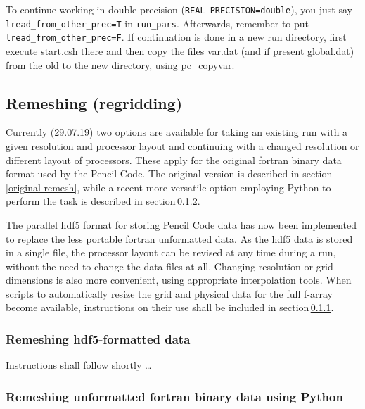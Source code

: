 \documentclass[\mydriver,12pt,twoside,notitlepage,a4paper]{article}
\newcommand{\code}[1]{\texttt{#1}}
\begin{document}
To continue working in double precision
(\code{REAL_PRECISION=double}), you just say
\code{lread_from_other_prec=T} in \code{run_pars}.
Afterwards, remember to put \code{lread_from_other_prec=F}.
If continuation is done in a new run directory, first execute start.csh there 
and then copy the files var.dat (and if present global.dat) from the old to the new directory,
using pc_copyvar.

\subsection{Remeshing (regridding)}
\label{S-remesh}
Currently (29.07.19) two options are available for taking an existing run with
a given resolution and processor layout and continuing with a changed
resolution or different layout of processors.
These apply for the original fortran binary data format used by the Pencil Code.
The original version is described in section\,\ref{original-remesh}, while
a recent more versatile option employing Python to perform the task is described
in section\,\ref{python-remesh}.

The parallel hdf5 format for storing Pencil Code data has now been implemented
to replace the less portable fortran unformatted data.
As the hdf5 data is stored in a single file, the processor layout can be
revised at any time during a run, without the need to change the data files at
all.
Changing resolution or grid dimensions is also more convenient, using
appropriate interpolation tools.
When scripts to automatically resize the grid and physical data for the full
f-array become available, instructions on their use 
shall be included in section\,\ref{h5-remesh}.

\subsubsection{Remeshing hdf5-formatted data}
\label{h5-remesh}
Instructions shall follow shortly \ldots

\subsubsection{Remeshing unformatted fortran binary data using Python}
\label{python-remesh}
\end{document}
